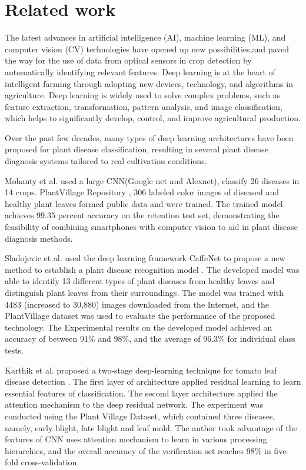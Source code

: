 \documentclass[a4paper,fleqn]{cas-sc}
\begin{document}
\section{Related work}
The latest advances in artificial intelligence (AI), machine learning (ML), and computer vision (CV) technologies have opened up new possibilities,and paved the way for the use of data from optical sensors in crop detection by automatically identifying relevant features. Deep learning is at the heart of intelligent farming through adopting new devices, technology, and algorithms in agriculture. Deep learning is widely used to solve complex problems, such as feature extraction, transformation, pattern analysis, and image classification, which helps to significantly develop, control, and improve agricultural production. 

Over the past few decades, many types of deep learning architectures have been proposed for plant disease classification, resulting in several plant disease diagnosis systems tailored to real cultivation conditions. 

Mohanty et al. used a large CNN(Google net and Alexnet), classify 26 diseases in 14 crops\citep{prasanna2016using}. PlantVillage Repository \citep{hughes2015open}, 306 labeled color images of diseased and healthy plant leaves formed public data and were trained. The trained model achieves 99.35 percent accuracy on the retention test set, demonstrating the feasibility of combining smartphones with computer vision to aid in plant disease diagnosis methods.

Sladojevic et al. used the deep learning framework CaffeNet to propose a new method to establish a plant disease recognition model \citep{sladojevic2016deep}. The developed model was able to identify 13 different types of plant diseases from healthy leaves and distinguish plant leaves from their surroundings. The model was trained with 4483 (increased to 30,880) images downloaded from the Internet, and the PlantVillage dataset was used to evaluate the performance of the proposed technology. The Experimental results on the developed model achieved an accuracy of between 91\% and 98\%, and the average of 96.3\% for individual class tests.

Karthik et al. proposed a two-stage deep-learning technique for tomato leaf disease detection \citep{karthik2020attention} . The first layer of architecture applied residual learning to learn essential features of classification. The second layer architecture applied the attention mechanism to the deep residual network. The experiment was conducted using the Plant Village Dataset, which contained three diseases, namely, early blight, late blight and leaf mold. The author took advantage of the features of CNN uses attention mechanism to learn in various processing hierarchies, and the overall accuracy of the verification set reaches 98\% in five-fold cross-validation.
\end{document}
